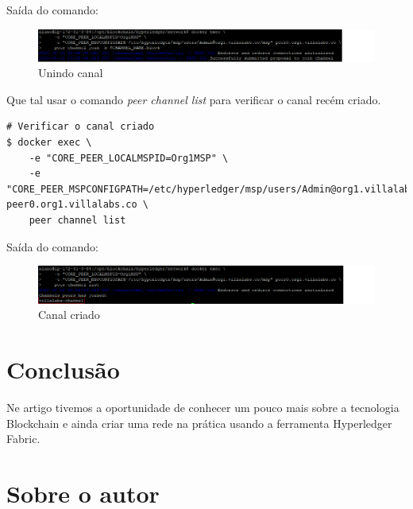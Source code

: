 \documentclass[a4paper,11pt]{article}
\begin{document}
Saída do comando:
\begin{figure}[H]
  \centering
  \includegraphics[width=1.1\textwidth]{imagens/join-canal.png}
  \caption{Unindo canal}
\end{figure}

Que tal usar o comando \textit{peer channel list} para verificar o canal recém criado.
\begin{lstlisting}
# Verificar o canal criado
$ docker exec \
    -e "CORE_PEER_LOCALMSPID=Org1MSP" \
    -e "CORE_PEER_MSPCONFIGPATH=/etc/hyperledger/msp/users/Admin@org1.villalabs.co/msp" peer0.org1.villalabs.co \
    peer channel list
\end{lstlisting}

Saída do comando:
\begin{figure}[H]
  \centering
  \includegraphics[width=1.1\textwidth]{imagens/lista-canal.png}
  \caption{Canal criado}
\end{figure}

\section{Conclusão}
Ne artigo tivemos a oportunidade de conhecer um pouco mais sobre a tecnologia Blockchain e ainda criar uma rede na prática usando a ferramenta Hyperledger\cite{hyperledger} Fabric\cite{hyperledgerfabric}. 

\section{Sobre o autor}

\end{document}
